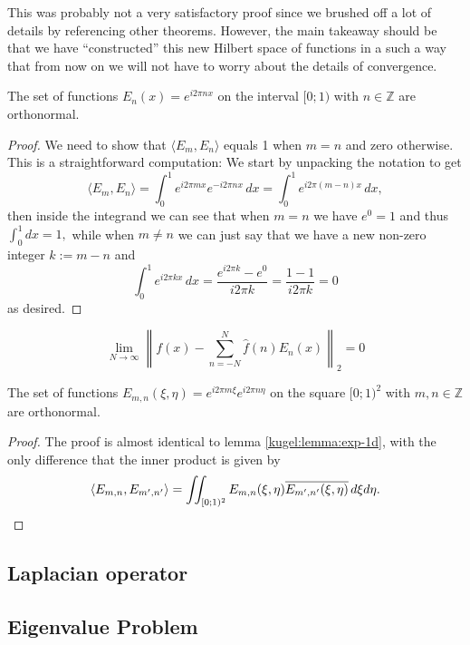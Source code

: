This was probably not a very satisfactory proof since we brushed off a lot of
details by referencing other theorems. However, the main takeaway should be
that we have ``constructed'' this new Hilbert space of functions in a such a
way that from now on we will not have to worry about the details of
convergence.

\begin{lemma}
  \label{kugel:lemma:exp-1d}
  The set of functions \(E_n(x) = e^{i2\pi nx}\) on the interval
  \([0; 1)\) with \(n \in \mathbb{Z} \) are orthonormal.
\end{lemma}
\begin{proof}
  We need to show that \(\langle E_m, E_n \rangle\) equals 1 when \(m = n\)
  and zero otherwise. This is a straightforward computation: We start by
  unpacking the notation to get
  \[
    \langle E_m, E_n \rangle
    = \int_0^1 e^{i2\pi mx} e^{- i2\pi nx} \, dx
    = \int_0^1 e^{i2\pi (m - n)x} \, dx,
  \]
  then inside the integrand we can see that when \(m = n\) we have \(e^0 = 1\) and
  thus \( \int_0^1 dx = 1, \) while when \(m \neq n\) we can just say that we
  have a new non-zero integer
  \(k := m - n\) and
  \[
    \int_0^1 e^{i2\pi kx} \, dx
    = \frac{e^{i2\pi k} - e^{0}}{i2\pi k}
    = \frac{1 - 1}{i2\pi k}
    = 0
  \]
  as desired. \qedhere
\end{proof}

\begin{definition}[Spectrum]
\end{definition}

\begin{theorem}
  \label{fourier-theorem-1D}
  \begin{equation*}
    \lim_{N \to \infty} \left \|
      f(x) - \sum_{n = -N}^N \hat{f}(n) E_n(x) 
    \right \|_2 = 0
  \end{equation*}
\end{theorem}

\begin{lemma}
  The set of functions \(E_{m, n}(\xi, \eta) = e^{i2\pi m\xi}e^{i2\pi n\eta}\)
  on the square \([0; 1)^2\) with \(m, n \in \mathbb{Z} \) are orthonormal.
\end{lemma}
\begin{proof}
  The proof is almost identical to lemma \ref{kugel:lemma:exp-1d}, with the
  only difference that the inner product is given by
  \[
    \langle E_{m,n}, E_{m', n'} \rangle
    = \iint_{[0;1)^2}
        E_{m, n}(\xi, \eta) \overline{E_{m', n'} (\xi, \eta)}
      \, d\xi d\eta
      .\qedhere
  \]
\end{proof}

\subsection{Laplacian operator}

\subsection{Eigenvalue Problem}
